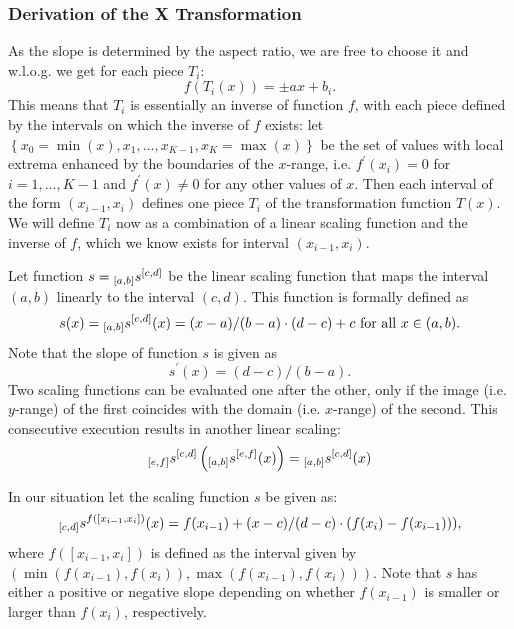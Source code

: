 \documentclass[11pt]{isuthesis}\usepackage[]{graphicx}\usepackage[]{color}
\begin{document}
\subsubsection{Derivation of the X Transformation}\label{app.xtrans}
As the slope is determined by the aspect ratio, we are free to choose it and w.l.o.g. we get for each piece $T_i$: 
\[
f(T_i(x)) = \pm a x + b_i.
\]
This means that $T_i$ is essentially an inverse of function $f$, with each piece defined by the   intervals on which the inverse of $f$ exists: let $\left\{x_0 = \min(x), x_1, ..., x_{K-1}, x_K = \max(x) \right\}$ be the set of values with local extrema enhanced by the boundaries of the $x$-range, i.e.  $f^\prime(x_i) = 0$ for  $i = 1, ... , K-1$ and $f^\prime(x) \neq 0$ for any other values of $x$. 
Then each interval of the form $(x_{i-1}, x_i)$ defines one piece $T_i$ of the transformation function $T(x)$. We will define $T_i$ now as a combination of a linear scaling function and the inverse of $f$, which we know exists for interval $(x_{i-1}, x_i)$.

Let function $s = {_{[a,b]}s^{ [c,d]}}$ be the linear scaling function that maps  the interval $(a,b)$ linearly to the interval $(c,d)$. This function is formally defined as
\[
s(x) = {_{[a,b]}s^{ [c,d]}} (x) = (x-a)/(b-a) \cdot (d-c) + c \text{ for all } x \in (a,b).
\]
Note that the slope of function $s$ is given as
\[
s^\prime(x) = (d-c)/(b-a).
\]
%
Two scaling functions can be evaluated one after the other, only if the image (i.e. $y$-range) of the first coincides with the domain (i.e. $x$-range) of the second. This consecutive execution results in another linear scaling: 
\[
{_{[e,f]}s^{ [c,d]}}  \left(  {_{[a,b]}s^{ [e,f]}}(x) \right) = {_{[a,b]}s^{ [c,d]}} (x)
\]


In our situation let the scaling function $s$ be given as:
\[
{_{[c,d]}s^{ f([x_{i-1}, x_i])}}(x) = f(x_{i-1}) + (x-c)/(d-c) \cdot (f(x_{i}) - f(x_{i-1}))),
\]
where $f([x_{i-1}, x_i])$ is defined as the interval given by $(\min(f(x_{i-1}), f(x_i)), \max(f(x_{i-1}), f(x_i)))$.
Note that $s$ has either a positive or negative slope depending on whether $f(x_{i-1})$ is smaller or larger than $f(x_i)$, respectively.
\end{document}
